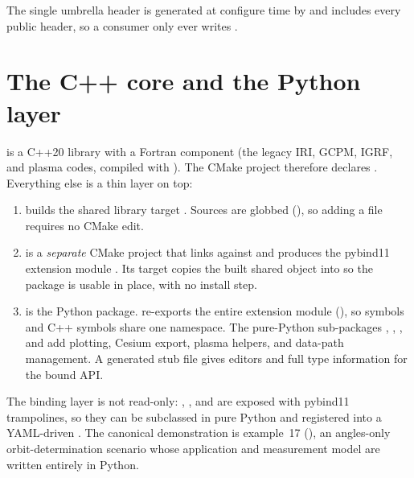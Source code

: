 The single umbrella header  is generated at configure
time by  and includes every public header, so a
consumer only ever writes .

\section{The C++ core and the Python layer}
\label{sec:intro-bindings}

\lupnt{} is a C++20 library with a Fortran component (the legacy IRI, GCPM,
IGRF, and  plasma codes, compiled with
). The CMake project therefore
declares . Everything else is a thin layer on top:

\begin{enumerate}[leftmargin=*]
  \item {} builds the shared library target . Sources
    are globbed (), so adding
    a  file requires no CMake edit.
  \item {} is a \emph{separate} CMake project that links
    against  and produces the pybind11 extension module
    . Its  target copies the built shared
    object into  so the package is usable in place, with
    no install step.
  \item {} is the Python package. 
    re-exports the entire extension module (),
    so  symbols and C++ symbols share one namespace. The
    pure-Python sub-packages ,
    , , and
     add plotting, Cesium export, plasma
    helpers, and data-path management. A generated stub file
     gives editors and  full
    type information for the bound API.
\end{enumerate}

The binding layer is not read-only: , , and
 are exposed with pybind11 trampolines, so they can be
subclassed in pure Python and registered into a YAML-driven .
The canonical demonstration is example~17
(), an angles-only
orbit-determination scenario whose application and measurement model are
written entirely in Python.

